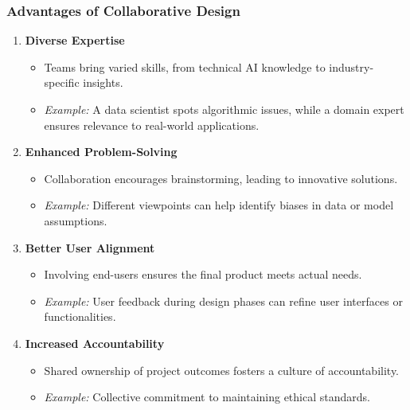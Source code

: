 \documentclass[aspectratio=169]{beamer}
\begin{document}
\begin{frame}[fragile]
    \frametitle{Advantages of Collaborative Design}
    \begin{enumerate}
        \item \textbf{Diverse Expertise}
        \begin{itemize}
            \item Teams bring varied skills, from technical AI knowledge to industry-specific insights.
            \item \textit{Example:} A data scientist spots algorithmic issues, while a domain expert ensures relevance to real-world applications.
        \end{itemize}
        
        \item \textbf{Enhanced Problem-Solving}
        \begin{itemize}
            \item Collaboration encourages brainstorming, leading to innovative solutions.
            \item \textit{Example:} Different viewpoints can help identify biases in data or model assumptions.
        \end{itemize}
        
        \item \textbf{Better User Alignment}
        \begin{itemize}
            \item Involving end-users ensures the final product meets actual needs.
            \item \textit{Example:} User feedback during design phases can refine user interfaces or functionalities.
        \end{itemize}
        
        \item \textbf{Increased Accountability}
        \begin{itemize}
            \item Shared ownership of project outcomes fosters a culture of accountability.
            \item \textit{Example:} Collective commitment to maintaining ethical standards.
        \end{itemize}
    \end{enumerate}
\end{frame}
\end{document}
